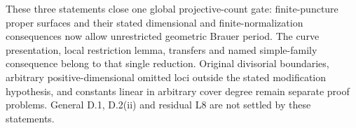 \begin{remark}
These three statements close one global projective-count gate:
finite-puncture proper surfaces and their stated dimensional and
finite-normalization consequences now allow unrestricted geometric
Brauer period. The curve presentation, local restriction lemma,
transfers and named simple-family consequence belong to that
single reduction. Original divisorial boundaries, arbitrary
positive-dimensional omitted loci outside the stated modification
hypothesis, and constants linear in arbitrary cover degree remain
separate proof problems. General D.1, D.2(ii) and residual L8
are not settled by these statements.
\end{remark}
